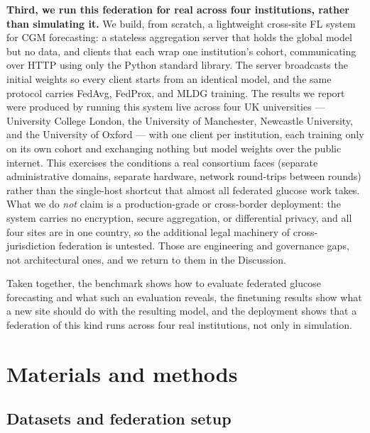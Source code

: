\documentclass[10pt,letterpaper]{article}
\begin{document}
\textbf{Third, we run this federation for real across four institutions, rather
than simulating it.} We build, from scratch, a lightweight
cross-site FL system for CGM forecasting: a stateless aggregation server that
holds the global model but no data, and clients that each wrap one institution's
cohort, communicating over HTTP using only the Python standard library. The server
broadcasts the initial weights so every client starts from an identical model, and
the same protocol carries FedAvg, FedProx, and MLDG training. The results we
report were produced by running this system live across four UK universities ---
University College London, the University of Manchester, Newcastle University, and
the University of Oxford --- with one client per institution, each training only on
its own cohort and exchanging nothing but model weights over the public internet.
This exercises the conditions a real consortium faces (separate administrative
domains, separate hardware, network round-trips between rounds) rather than the
single-host shortcut that almost all federated glucose work takes. What we do
\emph{not} claim is a production-grade or cross-border deployment: the system
carries no encryption, secure aggregation, or differential privacy, and all four
sites are in one country, so the additional legal machinery of cross-jurisdiction
federation is untested. Those are engineering and governance gaps, not
architectural ones, and we return to them in the Discussion.

Taken together, the benchmark shows how to evaluate federated glucose forecasting
and what such an evaluation reveals, the finetuning results show what a
new site should do with the resulting model, and the deployment shows that a
federation of this kind runs across four real institutions, not only in
simulation.

\section*{Materials and methods}

\subsection*{Datasets and federation setup}
\end{document}
